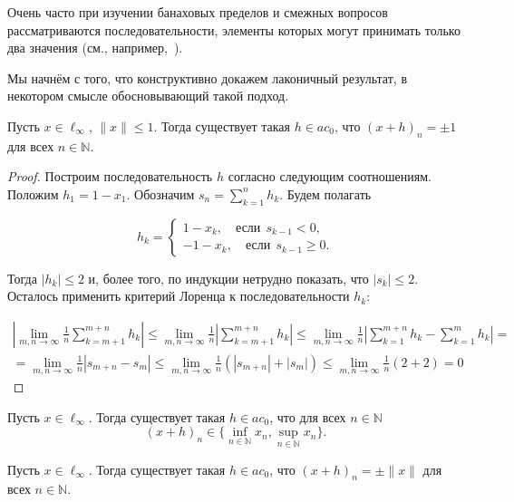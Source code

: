 Очень часто при изучении банаховых пределов и смежных вопросов
рассматриваются последовательности,
элементы которых могут принимать только два значения
(см., например,~\cite{connor1990almost,our-mz2019ac0,avdeev2021vestnik,avdeev2021vmzprimes}).


Мы начнём с того,
что конструктивно докажем лаконичный результат,
в некотором смысле обосновывающий такой подход.


\begin{lemma}
	Пусть $x\in\ell_\infty$, $\|x\|\leq 1$.
	Тогда существует такая $h\in ac_0$, что $(x+h)_n = \pm 1$ для всех $n\in\mathbb N$.
\end{lemma}

\begin{proof}
	Построим последовательность $h$ согласно следующим соотношениям.
	Положим $h_1 = 1-x_1$.
	Обозначим $s_n = \sum_{k=1}^n h_k$. Будем полагать

	$$
		h_k = \begin{cases}
			1-x_k, \quad\mbox{если}~~ s_{k-1} < 0,
			\\
			-1 - x_k,\quad\mbox{если}~~ s_{k-1} \geq 0
			.
		\end{cases}
	$$

	Тогда $|h_k| \leq 2$ и, более того, по индукции нетрудно показать, что $|s_k| \leq 2$. Осталось применить критерий Лоренца к последовательности $h_k$:

	\begin{multline*}
		\left|\lim_{m,n\to \infty} \frac{1}{n} \sum_{k=m+1}^{m+n} h_k\right| \leq
		\lim_{m,n\to \infty} \frac{1}{n} \left|\sum_{k=m+1}^{m+n} h_k\right| \leq
		\lim_{m,n\to \infty} \frac{1}{n} \left|\sum_{k=1}^{m+n} h_k - \sum_{k=1}^{m} h_k  \right| =
		\\=
		\lim_{m,n\to \infty} \frac{1}{n} \left|s_{m+n} - s_{m}  \right| \leq
		\lim_{m,n\to \infty} \frac{1}{n} (|s_{m+n}| + |s_{m} |) \leq
		\lim_{m,n\to \infty} \frac{1}{n} (2 + 2) =0
	\end{multline*}
\end{proof}

\begin{corollary}
	Пусть $x\in\ell_\infty$.
	Тогда существует такая $h\in ac_0$, что для всех $n\in\mathbb N$
	\begin{equation*}
		(x+h)_n \in \{\inf_{n\in\mathbb N} x_n,\sup_{n\in\mathbb N} x_n\}
		.
	\end{equation*}
\end{corollary}


\begin{corollary}
	Пусть $x\in\ell_\infty$.
	Тогда существует такая $h\in ac_0$, что $(x+h)_n =\pm \|x\|$ для всех $n\in\mathbb N$.
\end{corollary}

